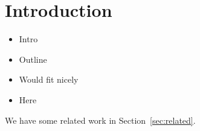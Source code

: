 \section{Introduction}
\label{sec:intro}

\begin{itemize}
  \item Intro
  \item Outline
  \item Would fit nicely
  \item Here
\end{itemize}

We have some related work in Section~\ref{sec:related}.
